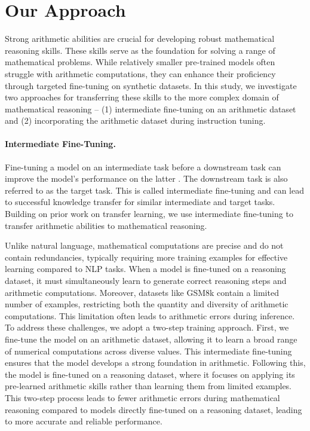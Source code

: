\section{Our Approach}
Strong arithmetic abilities are crucial for developing robust mathematical reasoning skills. These skills serve as the foundation for solving a range of mathematical problems. While relatively smaller pre-trained models often struggle with arithmetic computations, they can enhance their proficiency through targeted fine-tuning on synthetic datasets. In this study, we investigate two approaches for transferring these skills to the more complex domain of mathematical reasoning -- (1) intermediate fine-tuning on an arithmetic dataset and (2) incorporating the arithmetic dataset during instruction tuning.

\paragraph{Intermediate Fine-Tuning.}
Fine-tuning a model on an intermediate task before a downstream task can improve the model's performance on the latter \citep{phang2018sentence, vu-etal-2020-exploring, pruksachatkun2020intermediate}. The downstream task is also referred to as the target task. This is called intermediate fine-tuning and can lead to successful knowledge transfer for similar intermediate and target tasks. Building on prior work on transfer learning, we use intermediate fine-tuning to transfer arithmetic abilities to mathematical reasoning.

Unlike natural language, mathematical computations are precise and do not contain redundancies, typically requiring more training examples for effective learning compared to NLP tasks. When a model is fine-tuned on a reasoning dataset, it must simultaneously learn to generate correct reasoning steps and arithmetic computations. Moreover, datasets like GSM8k contain a limited number of examples, restricting both the quantity and diversity of arithmetic computations. This limitation often leads to arithmetic errors during inference. To address these challenges, we adopt a two-step training approach. First, we fine-tune the model on an arithmetic dataset, allowing it to learn a broad range of numerical computations across diverse values. This intermediate fine-tuning ensures that the model develops a strong foundation in arithmetic. Following this, the model is fine-tuned on a reasoning dataset, where it focuses on applying its pre-learned arithmetic skills rather than learning them from limited examples. This two-step process leads to fewer arithmetic errors during mathematical reasoning compared to models directly fine-tuned on a reasoning dataset, leading to more accurate and reliable performance.

